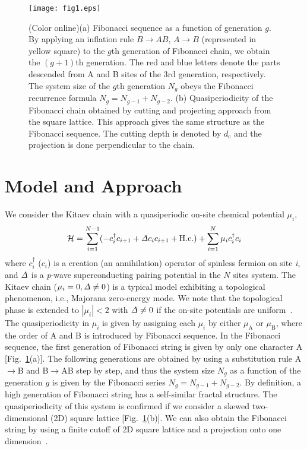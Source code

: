 \documentclass[%
superscriptaddress,
preprint,
amsmath,amssymb,
]{revtex4-1}
\newcommand{\mrm}{\mathrm}
\begin{document}

\begin{figure}[t]
	\centering
	\texttt{[image: fig1.eps]}
	\caption{(Color online)(a) Fibonacci sequence as a function of generation $g$. By applying an inflation rule $B\rightarrow AB$, $A\rightarrow B$ (represented in yellow square) to the $g$th generation of Fibonacci chain, we obtain the $(g+1)$th generation. The red and blue letters denote the parts descended from A and B sites of the 3rd generation, respectively. The system size of the $g$th generation $N_g$ obeys the Fibonacci recurrence formula $N_g=N_{g-1}+N_{g-2}$.
		(b) Quasiperiodicity of the Fibonacci chain obtained by cutting and projecting approach from the square lattice. This approach gives the same structure as the Fibonacci sequence.
		The cutting depth is denoted by $d_{\mrm{c}}$ and the projection is done perpendicular to the chain.}
	\label{fig:fibo}
\end{figure}


\section{\label{model} Model and Approach}

We consider the Kitaev chain with a quasiperiodic on-site chemical potential $\mu_i$,
\begin{equation}
\mathcal{H}=\sum_{i=1}^{N-1} (-c^\dagger_ic_{i+1}+{\it\Delta} c_ic_{i+1}+\mrm{H.c.}) +\sum_{i=1}^N\mu_i c^{\dagger}_ic_i
\label{eq:ham}	
\end{equation}
where $c^\dagger_i$ ($c_i$) is a creation (an annihilation) operator of spinless fermion on site {\it i}, and ${\it\Delta}$ is a {\it p}-wave superconducting pairing potential in the $N$ sites system.  
The Kitaev chain ($\mu_i=0, {\it\Delta}\neq0$) is a typical model exhibiting a topological phenomenon, i.e., Majorana zero-energy mode.
We note that the topological phase is extended to $|\mu_i|<2$ with ${\it\Delta}\neq 0$ if the on-site potentials are uniform~\cite{Hassler12}.
The quasiperiodicity in $\mu_i$ is given by assigning each $\mu_i$ by either $\mu_{\mrm{A}}$ or $\mu_{\mrm{B}}$, where the order of A and B is introduced by Fibonacci sequence.
In the Fibonacci sequence, the first generation of Fibonacci string is given by only one character A [Fig.~\ref{fig:fibo}(a)].
The following generations are obtained by using a substitution rule A$\to$B and B$\to$AB step by step, and thus the system size $N_g$ as a function of the generation $g$ is given by the Fibonacci series $N_g=N_{g-1}+N_{g-2}$.
By definition, a high generation of Fibonacci string has a self-similar fractal structure.
The quasiperiodicity of this system is confirmed if we consider a skewed two-dimensional (2D) square lattice [Fig.~\ref{fig:fibo}(b)].
We can also obtain the Fibonacci string by using a finite cutoff of 2D square lattice and a projection onto one dimension~\cite{Kraus16}.
\end{document}
